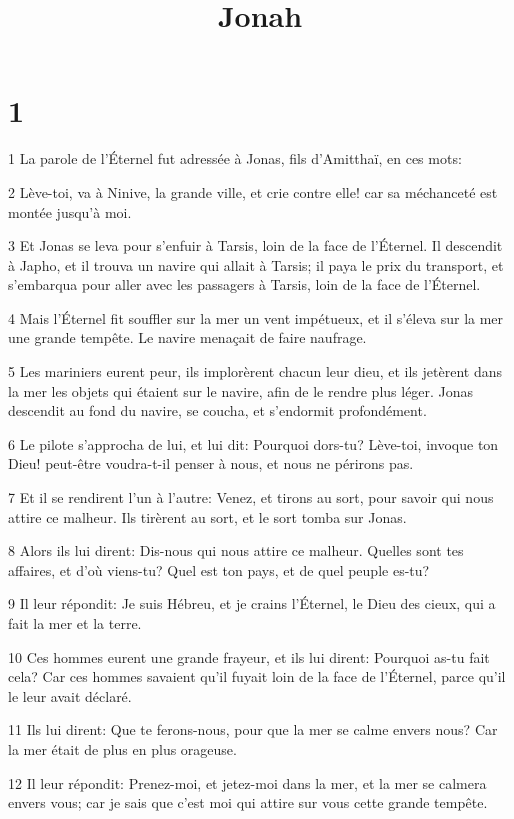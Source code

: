 

\title{Jonah}


\chapter{1}

\par 1 La parole de l'Éternel fut adressée à Jonas, fils d'Amitthaï, en ces mots:
\par 2 Lève-toi, va à Ninive, la grande ville, et crie contre elle! car sa méchanceté est montée jusqu'à moi.
\par 3 Et Jonas se leva pour s'enfuir à Tarsis, loin de la face de l'Éternel. Il descendit à Japho, et il trouva un navire qui allait à Tarsis; il paya le prix du transport, et s'embarqua pour aller avec les passagers à Tarsis, loin de la face de l'Éternel.
\par 4 Mais l'Éternel fit souffler sur la mer un vent impétueux, et il s'éleva sur la mer une grande tempête. Le navire menaçait de faire naufrage.
\par 5 Les mariniers eurent peur, ils implorèrent chacun leur dieu, et ils jetèrent dans la mer les objets qui étaient sur le navire, afin de le rendre plus léger. Jonas descendit au fond du navire, se coucha, et s'endormit profondément.
\par 6 Le pilote s'approcha de lui, et lui dit: Pourquoi dors-tu? Lève-toi, invoque ton Dieu! peut-être voudra-t-il penser à nous, et nous ne périrons pas.
\par 7 Et il se rendirent l'un à l'autre: Venez, et tirons au sort, pour savoir qui nous attire ce malheur. Ils tirèrent au sort, et le sort tomba sur Jonas.
\par 8 Alors ils lui dirent: Dis-nous qui nous attire ce malheur. Quelles sont tes affaires, et d'où viens-tu? Quel est ton pays, et de quel peuple es-tu?
\par 9 Il leur répondit: Je suis Hébreu, et je crains l'Éternel, le Dieu des cieux, qui a fait la mer et la terre.
\par 10 Ces hommes eurent une grande frayeur, et ils lui dirent: Pourquoi as-tu fait cela? Car ces hommes savaient qu'il fuyait loin de la face de l'Éternel, parce qu'il le leur avait déclaré.
\par 11 Ils lui dirent: Que te ferons-nous, pour que la mer se calme envers nous? Car la mer était de plus en plus orageuse.
\par 12 Il leur répondit: Prenez-moi, et jetez-moi dans la mer, et la mer se calmera envers vous; car je sais que c'est moi qui attire sur vous cette grande tempête.
